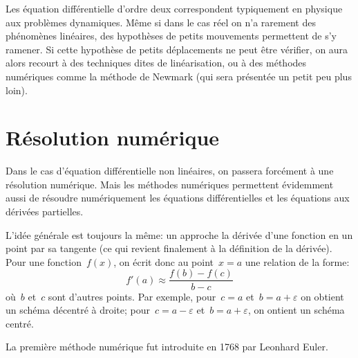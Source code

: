 Les équation différentielle d'ordre deux correspondent typiquement en physique aux problèmes dynamiques. Même si dans le cas réel on n'a rarement des phénomènes linéaires, des hypothèses de petits mouvements permettent de s'y ramener. Si cette hypothèse de petits déplacements ne peut être vérifier, on aura alors recourt à des techniques dites de linéarisation, ou à des méthodes numériques comme la méthode de Newmark (qui sera présentée un petit peu plus loin).
 
\section{Résolution numérique} 
Dans le cas d'équation différentielle non linéaires, on passera forcément à une résolution numérique. Mais les méthodes numériques permettent évidemment aussi de résoudre numériquement les équations différentielles et les équations aux dérivées partielles.

L'idée générale est toujours la même: un approche la dérivée d'une fonction en un point par sa tangente (ce qui revient finalement à la définition de la dérivée). Pour une fonction~$f(x)$, on écrit donc au point~$x=a$ une relation de la forme:
\begin{equation}
f'(a)\approx \frac{f(b)-f(c)}{b-c}
\end{equation}
où~$b$ et~$c$ sont d'autres points. Par exemple, pour~$c=a$ et~$b=a+\varepsilon$ on obtient un schéma décentré à droite; pour~$c=a-\varepsilon$ et~$b=a+\varepsilon$, on ontient un schéma centré.
 
\begin{histoire}
La première méthode numérique fut introduite en 1768 par Leonhard Euler.\\
\end{histoire}
